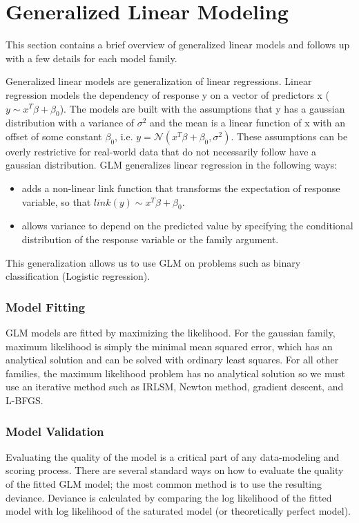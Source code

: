\documentclass[11pt]{article}
\begin{document}
\section{Generalized Linear Modeling} 
This section contains a brief overview of generalized linear models and follows up with a few details for each model family.

Generalized linear models are generalization of linear regressions. Linear regression models the dependency of response y on a vector of predictors x ($y \sim x^T \beta + \beta_0$). The models are built with the assumptions that y has a gaussian distribution with a variance of $\sigma^2$ and the mean is a linear function of x with an offset of some constant $\beta_0$, i.e. $ y = \mathcal{N}(x^T \beta + \beta_0 ,  \sigma^2) $. These assumptions can be overly restrictive for real-world data that do not necessarily follow have a gaussian distribution. GLM generalizes linear regression in the following ways: 
\begin{itemize} 
\item adds a non-linear link function that transforms the expectation of response variable, so that $link(y) \sim x^T \beta + \beta_0$.
\item allows variance to depend on the predicted value by specifying the conditional distribution of the response variable or the family argument.

\end{itemize}
This generalization allows us to use GLM on problems such as binary classification (Logistic regression).

\subsubsection{Model Fitting}
GLM models are fitted by maximizing the likelihood. For the gaussian family, maximum likelihood is simply the minimal mean squared error, which has an analytical solution and can be solved with ordinary least squares. For all other families, the maximum likelihood problem has no analytical solution so we must use an iterative method such as IRLSM, Newton method, gradient descent, and L-BFGS.
\subsubsection{Model Validation}
Evaluating the quality of the model is a critical part of any data-modeling and scoring process. There are several standard ways on how to evaluate the quality of the fitted GLM model; the most common method is to use the resulting deviance. Deviance is calculated by comparing the log likelihood of the fitted model with log likelihood of the saturated model (or theoretically perfect model).
\end{document}
